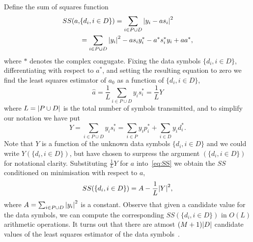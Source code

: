 \documentclass[journal]{IEEEtran}
\begin{document}
Define the sum of squares function
\begin{align}
SS(a, &\{d_i, i \in D\}) = \sum_{i \in P \cup D} {\left\vert  y_i - a s_i  \right\vert}^2 \nonumber \\
&= \sum_{i \in P \cup D} {\left\vert y_i \right\vert}^2 - a s_i y_i^* - a^* s_i^* y_i + aa^*, \label{eq:SS}
\end{align}
where $*$ denotes the complex congugate.  Fixing the data symbols $\{d_i, i \in D\}$, differentiating with respect to $a^*$, and setting the resulting equation to zero we find the least squares estimator of $a_0$ as a function of $\{d_i, i \in D\}$,
\begin{equation}\label{eq:hata}
\hat{a} = \frac{1}{L} \sum_{i \in P \cup D} y_i s_i^* = \frac{1}{L} Y
\end{equation}
where $L = {\left\vert P \cup D \right\vert}$ is the total number of symbols transmitted, and to simplify our notation we have put 
\[
Y = \sum_{i \in P \cup D} y_i s_i^* = \sum_{i \in P } y_i p_i^* + \sum_{i \in D } y_i d_i^*.
\]  
Note that $Y$ is a function of the unknown data symbols $\{ d_i, i \in D\}$ and we could write $Y(\{ d_i, i \in D\})$, but have chosen to surpress the argument $(\{ d_i, i \in D\})$ for notational clarity.  Substituting $\frac{1}{L}Y$ for $a$ into~\eqref{eq:SS} we obtain the $SS$ conditioned on minimisation with respect to $a$,
\begin{equation}\label{eq:SSdatasymbols}
SS(\{d_i, i \in D\}) = A - \frac{1}{L}{\left\vert Y \right\vert}^2,
\end{equation}
where $A = \sum_{i \in P \cup D}{\left\vert y_i \right\vert}^2$ is a constant.  Observe that given a candidate value for the data symbols, we can compute the corresponding $SS(\{d_i, i \in D\})$ in $O(L)$ arithmetic operations.  It turns out that there are atmost $(M+1){\left\vert D \right\vert}$ candidate values of the least squares estimator of the data symbols~\cite{Sweldens2001,Mackenthun1994}.  %
\end{document}
